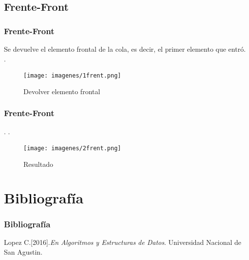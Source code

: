 \documentclass{beamer}
\begin{document}
\subsection{Frente-Front}
    \begin{frame}
      \frametitle{Frente-Front}
      Se devuelve el elemento frontal de la cola, es decir, el primer elemento que entró.\\ 
      .\\
      
      \begin{figure}
	\texttt{[image: imagenes/1frent.png]}
     \caption{Devolver elemento frontal}
     \end{figure}
      
    \end{frame}
    \begin{frame}
      \frametitle{Frente-Front}
.
      .\\
      \begin{figure}
	\texttt{[image: imagenes/2frent.png]}
    \caption{Resultado}
    \end{figure}
    
    \end{frame}



\section{Bibliografía}
\begin{frame}
\frametitle{Bibliografía}
\begin{thebibliography}{99}

 Lopez C.[2016].\emph{En Algoritmos y Estructuras de Datos}. Universidad Nacional de San Agustin.

\end{thebibliography}
\end{frame}
\end{document}
